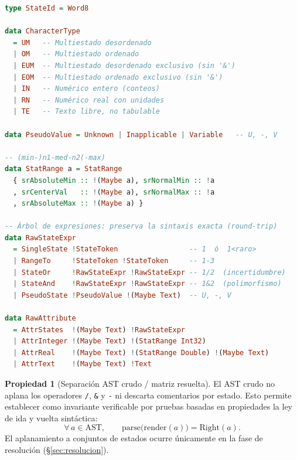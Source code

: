 \documentclass[11pt,a4paper]{article}
\theoremstyle{definition}
\newtheorem{propiedad}{Propiedad}[section]
\theoremstyle{remark}
\begin{document}
\begin{lstlisting}[language=Haskell, caption={Modelo formal de caracteres, pseudo-valores y atributos crudos (extracto de \texttt{Taxide.Core.Types})}, label={lst:types}]
type StateId = Word8

data CharacterType
  = UM   -- Multiestado desordenado
  | OM   -- Multiestado ordenado
  | EUM  -- Multiestado desordenado exclusivo (sin '&')
  | EOM  -- Multiestado ordenado exclusivo (sin '&')
  | IN   -- Numérico entero (conteos)
  | RN   -- Numérico real con unidades
  | TE   -- Texto libre, no tabulable

data PseudoValue = Unknown | Inapplicable | Variable   -- U, -, V

-- (min-)n1-med-n2(-max)
data StatRange a = StatRange
  { srAbsoluteMin :: !(Maybe a), srNormalMin :: !a
  , srCenterVal   :: !(Maybe a), srNormalMax :: !a
  , srAbsoluteMax :: !(Maybe a) }

-- Árbol de expresiones: preserva la sintaxis exacta (round-trip)
data RawStateExpr
  = SingleState !StateToken                 -- 1  ó  1<raro>
  | RangeTo     !StateToken !StateToken     -- 1-3
  | StateOr     !RawStateExpr !RawStateExpr -- 1/2  (incertidumbre)
  | StateAnd    !RawStateExpr !RawStateExpr -- 1&2  (polimorfismo)
  | PseudoState !PseudoValue !(Maybe Text)  -- U, -, V

data RawAttribute
  = AttrStates  !(Maybe Text) !RawStateExpr
  | AttrInteger !(Maybe Text) !(StatRange Int32)
  | AttrReal    !(Maybe Text) !(StatRange Double) !(Maybe Text)
  | AttrText    !(Maybe Text) !Text
\end{lstlisting}

\begin{propiedad}[Separación AST crudo / matriz resuelta]
El AST crudo no aplana los operadores \texttt{/}, \texttt{\&} y \texttt{-} ni descarta comentarios por estado. Esto permite establecer como invariante verificable por pruebas basadas en propiedades la ley de ida y vuelta sintáctica:
\begin{equation}
\label{eq:roundtrip}
\forall\, a \in \mathrm{AST}, \qquad \mathrm{parse}\big(\mathrm{render}(a)\big) = \mathrm{Right}(a).
\end{equation}
El aplanamiento a conjuntos de estados ocurre únicamente en la fase de resolución (\S\ref{sec:resolucion}).
\end{propiedad}
\end{document}
